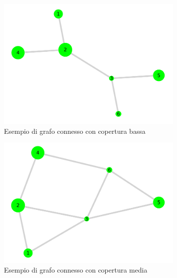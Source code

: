 \begin{figure}[!hb]
	\centering
	\begin{subfigure}[b]{0.3\textwidth}
		\centering
		\includegraphics[width=\textwidth]{img/plot_4.pdf}
		\caption{Esempio di grafo connesso con copertura bassa}
		\label{fig:connected_graph_example_low}
	\end{subfigure}
	\hfill
	\begin{subfigure}[b]{0.3\textwidth}
		\centering
		\includegraphics[width=\textwidth]{img/plot_5.pdf}
		\caption{Esempio di grafo connesso con copertura media}
		\label{fig:connected_graph_example_medium}
	\end{subfigure}
	\hfill
	\begin{subfigure}[b]{0.3\textwidth}

\end{subfigure}
\end{figure}
